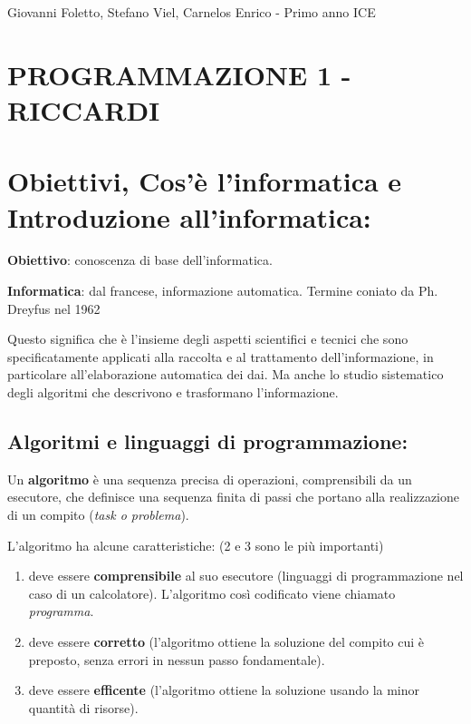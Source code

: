 \documentclass[
]{article}
\author{}
\date{}
\begin{document}
Giovanni Foletto, Stefano Viel, Carnelos Enrico - Primo anno ICE

\hypertarget{header-n2}{%
\section{PROGRAMMAZIONE 1 - RICCARDI}\label{header-n2}}

\hypertarget{header-n3}{%
\section{Obiettivi, Cos'è l'informatica e Introduzione
all'informatica:}\label{header-n3}}

\textbf{Obiettivo}: conoscenza di base dell'informatica.

\textbf{Informatica}: dal francese, informazione automatica. Termine
coniato da Ph. Dreyfus nel 1962

Questo significa che è l'insieme degli aspetti scientifici e tecnici che
sono specificatamente applicati alla raccolta e al trattamento
dell'informazione, in particolare all'elaborazione automatica dei dai.
Ma anche lo studio sistematico degli algoritmi che descrivono e
trasformano l'informazione.

\hypertarget{header-n7}{%
\subsection{Algoritmi e linguaggi di programmazione:}\label{header-n7}}

Un \textbf{algoritmo} è una sequenza precisa di operazioni,
comprensibili da un esecutore, che definisce una sequenza finita di
passi che portano alla realizzazione di un compito (\emph{task o
problema}).

L'algoritmo ha alcune caratteristiche: (2 e 3 sono le più importanti)

\begin{enumerate}
\def\labelenumi{\arabic{enumi}.}
\item
  deve essere \textbf{comprensibile} al suo esecutore (linguaggi di
  programmazione nel caso di un calcolatore). L'algoritmo così
  codificato viene chiamato \emph{programma}.
\item
  deve essere \textbf{corretto } (l'algoritmo ottiene la soluzione del
  compito cui è preposto, senza errori in nessun passo fondamentale).
\item
  deve essere \textbf{efficente} (l'algoritmo ottiene la soluzione
  usando la minor quantità di risorse).
\end{enumerate}
\end{document}
